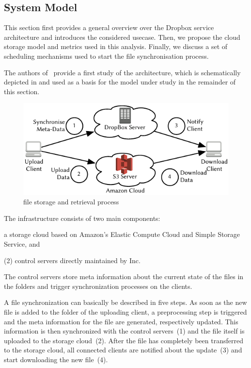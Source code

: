 \subsection{System Model}\label{sec:application:cloud_file_synchronisation:system_model}
This section first provides a general overview over the Dropbox service architecture and introduces the considered usecase.
Then, we propose the cloud storage model and metrics used in this analysis.
Finally, we discuss a set of scheduling mechanisms used to start the file synchronisation process. 

The authors of~\cite{Drago2012} provide a first study of the \dropbox architecture, which is schematically depicted in  and used as a basis for the model under study in the remainder of this section.

\begin{figure}
  \centering
  \includegraphics[width=\columnwidth]{application/cloud_file_synchronization/system_model/figures/dropbox_architecture}
  \caption{\dropbox file storage and retrieval process}
  \label{fig:application:cloud_file_synchronisation:system_model:dropbox_architecture}
\end{figure}

The \dropbox infrastructure consists of two main components:
\begin{enumerate*}
\item a storage cloud based on Amazon's Elastic Compute Cloud and Simple Storage Service, and 
\item (2) control servers directly maintained by \dropbox Inc. 
\end{enumerate*}
The control servers store meta information about the current state of the files in the \dropbox folders and trigger synchronization processes on the clients.

A file synchronization can basically be described in five steps.
As soon as the new file is added to the \dropbox folder of the uploading client, a preprocessing step is triggered and the meta information for the file are generated, respectively updated.
This information is then synchronized with the control servers~(1) and the file itself is uploaded to the storage cloud~(2).
After the file has completely been transferred to the storage cloud, all connected clients are notified about the update~(3) and start downloading the new file~(4).

